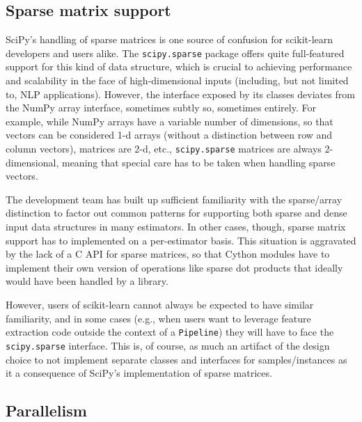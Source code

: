 \documentclass{llncs}
\begin{document}
\subsection{Sparse matrix support}

SciPy's handling of sparse matrices is one source of confusion
for scikit-learn developers and users alike.
The \texttt{scipy.sparse} package offers quite full-featured support
for this kind of data structure,
which is crucial to achieving performance and scalability
in the face of high-dimensional inputs
(including, but not limited to, NLP applications).
However, the interface exposed by its classes
deviates from the NumPy array interface, sometimes subtly so,
sometimes entirely.  %
For example, while NumPy arrays have a variable number of dimensions,
so that vectors can be considered 1-d arrays
(without a distinction between row and column vectors),
matrices are 2-d, etc., \texttt{scipy.sparse} matrices are always 2-dimensional,
meaning that special care has to be taken when handling sparse vectors.

The development team has built up sufficient familiarity
with the sparse/array distinction to factor out common patterns
for supporting both sparse and dense input data structures in many estimators.
In other cases, though, sparse matrix support has to implemented
on a per-estimator basis.
This situation is aggravated by the lack of a C API for sparse matrices,
so that Cython modules have to implement their own version
of operations like sparse dot products
that ideally would have been handled by a library.

However, users of scikit-learn cannot always be expected
to have similar familiarity, and in some cases
(e.g., when users want to leverage feature extraction code
outside the context of a \texttt{Pipeline})
they will have to face the \texttt{scipy.sparse} interface.
This is, of course, as much an artifact of the design choice
to not implement separate classes and interfaces for samples/instances
as it a consequence of SciPy's implementation of sparse matrices.

\subsection{Parallelism}
\end{document}
